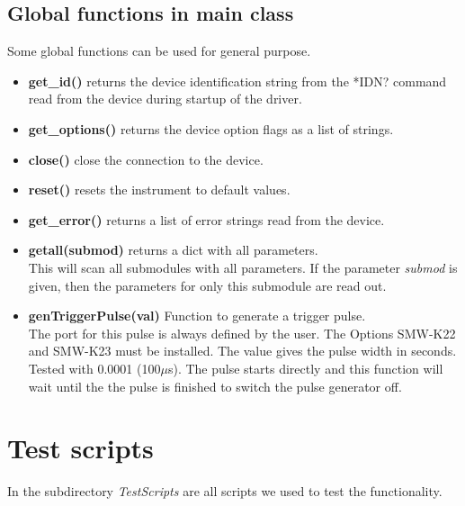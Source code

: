 \documentclass[11pt]{article} %
\begin{document}
\subsection{Global functions in main class}

Some global functions can be used for general purpose.

\begin{itemize}

\item {\bf get\_id()} returns the device identification string from the *IDN? command read from the device during startup of the driver.

\item {\bf get\_options()} returns the device option flags as a list of strings.

\item {\bf close()} close the connection to the device.

\item {\bf reset()} resets the instrument to default values.

\item {\bf get\_error()} returns a list of error strings read from the device.

\item {\bf getall(submod)} returns a dict with all parameters. \\
This will scan all submodules with all parameters. If the parameter {\it submod} is given, then the parameters for only this submodule are read out.

\item {\bf genTriggerPulse(val)} Function to generate a trigger pulse. \\
The port for this pulse is always defined by the user. The Options SMW-K22 and SMW-K23 must be installed. The value gives the pulse width in seconds. Tested with 0.0001 (100$\mu$s). The pulse starts directly and this function will wait until the the pulse is finished to switch the pulse generator off.

\end{itemize}


\section{Test scripts}

In the subdirectory {\it TestScripts} are all scripts we used to test the functionality.
\end{document}
